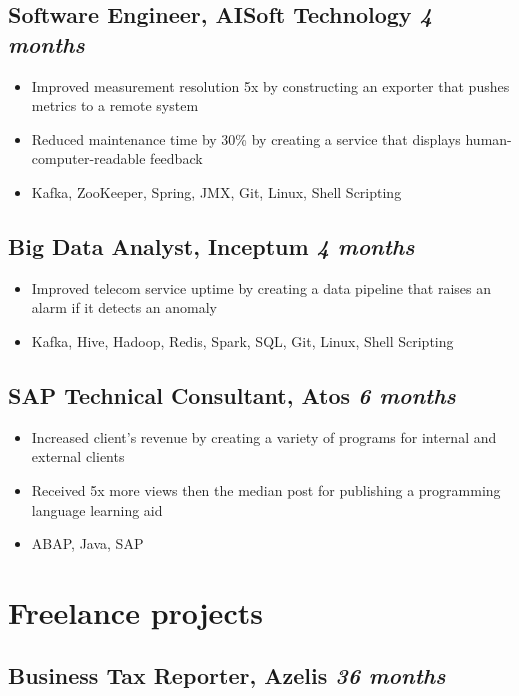 \documentclass[a4paper]{article}
\newcommand{\bolditalicpair}
[2]
{\textbf{#1} \texorpdfstring{\hfill}{} \textit{#2}}
\begin{document}
\subsection{\bolditalicpair{Software Engineer, AISoft Technology}{4 months}}

\begin{itemize}
  \item Improved measurement resolution 5x by constructing an exporter that pushes metrics to a remote system
  \item Reduced maintenance time by 30\% by creating a service that displays human-computer-readable feedback
  \item Kafka, ZooKeeper, Spring, JMX, Git, Linux, Shell Scripting
\end{itemize}

\subsection{\bolditalicpair{Big Data Analyst, Inceptum}{4 months}}

\begin{itemize}
  \item Improved telecom service uptime by creating a data pipeline that raises an alarm if it detects an anomaly
  \item Kafka, Hive, Hadoop, Redis, Spark, SQL, Git, Linux, Shell Scripting
\end{itemize}

\subsection{\bolditalicpair{SAP Technical Consultant, Atos}{6 months}}

\begin{itemize}
  \item Increased client's revenue by creating a variety of programs for internal and external clients
  \item Received 5x more views then the median post for publishing a programming language learning aid
  \item ABAP, Java, SAP
\end{itemize}



\section{Freelance projects}
\subsection{\bolditalicpair{Business Tax Reporter, Azelis}{36 months}}
\end{document}
